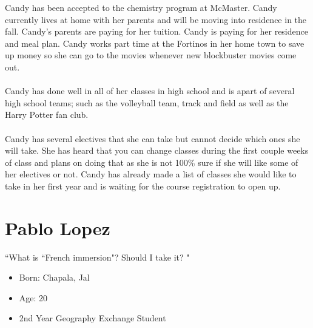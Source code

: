 \documentclass[10pt]{article}
\begin{document}
Candy has been accepted to the chemistry program at McMaster. Candy currently lives at home with her parents and will be moving into residence in the fall. Candy's parents are paying for her tuition. Candy is paying for her residence and meal plan. Candy works part time at the Fortinos in her home town to save up money so she can go to the movies whenever new blockbuster movies come out.\\ \\
Candy has done well in all of her classes in high school and is apart of several high school teams; such as the volleyball team, track and field as well as the Harry Potter fan club.\\  \\
Candy has several electives that she can take but cannot decide which ones she will take. She has heard that you can change classes during the first couple weeks of class and plans on doing that as she is not 100\% sure if she will like some of her electives or not. Candy has already made a list of classes she would like to take in her first year and is waiting for the course registration to open up.
\newpage

\section{Pablo Lopez}
\begin{minipage}{0.5\textwidth}
\begin{center}
``What is  ``French immersion"? Should I take it? "
\end{center}
\end{minipage}\hfill
\begin{minipage}{0.45\textwidth}
\begin{itemize}
\item Born: Chapala, Jal
\item Age: 20
\item 2nd Year Geography Exchange Student
\end{itemize}
\end{minipage}\\ \\ \\
\end{document}
